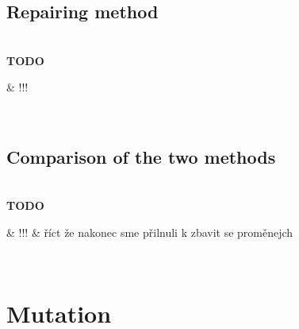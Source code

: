 \documentclass[12pt,a4paper]{report}
\newenvironment{todo}
{ ~\\[0.5em]
  {\color{red}\textbf{TODO}}
  \begin{easylist}[itemize]}
{ \end{easylist}
  ~}
\begin{document}
\subsection{ Repairing method }
\label{repairing-method}

\begin{todo}
& !!!
\end{todo}


\subsection{ Comparison of the two methods }
\label{comarison-ski-repairing}

\begin{todo}
& !!!
& říct že nakonec sme přilnuli k zbavit se proměnejch
\end{todo}

\newpage
\section{Mutation}
\end{document}
